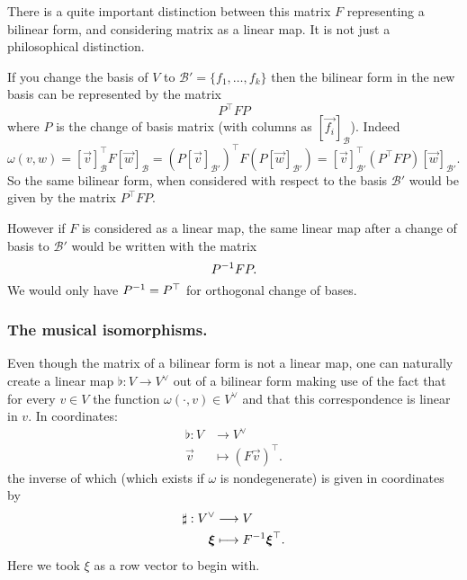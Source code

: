 \documentclass[12pt]{amsart}
\begin{document}
\begin{remark}
There is a quite important distinction between this matrix $F$ representing a bilinear form, and considering matrix as a linear map. It is not just a philosophical distinction.

If you change the basis of $V$ to $\mathcal{B}' = \{f_1, \ldots, f_k\}$ then the bilinear form in the new basis can be represented by the matrix $$P^\top F P$$ where $P$ is the change of basis matrix (with columns as $[\vec{f_i}]_\mathcal{B}$). Indeed $\omega(v,w) = [\vec{v}]_{\mathcal{B}}^\top F [\vec{w}]_{\mathcal{B} } = (P[\vec{v}]_{\mathcal{B}'})^\top F (P[\vec{w}]_{\mathcal{B}'}) = [\vec{v}]_{\mathcal{B}'}^\top (P^\top F P) [\vec{w}]_{\mathcal{B}' } $. So the same bilinear form, when considered with respect to the basis $\mathcal{B}'$ would be given by the matrix $P^\top FP$.

 However if $F$ is considered as a linear map, the same linear map after a change of basis to $\mathcal{B}'$ would be written with the matrix $$P^{-1} F P.$$ We would only have $P^{-1} = P^\top$ for orthogonal change of bases. 
\end{remark}

\subsubsection*{The musical isomorphisms. }Even though the matrix of a bilinear form is not a linear map, one can naturally create a linear map $\flat : V \to V^\vee$ out of a bilinear form making use of the fact that for every $v \in V$ the function $\omega(\cdot, v) \in V^\vee$ and that this correspondence is linear in $v$. In coordinates:
\begin{align*}
	\flat : V & \longrightarrow V^\vee\\
	 \vec{v}& \longmapsto (F\vec{v})^\top.
\end{align*}
the inverse of which (which exists if $\omega$ is nondegenerate) is given in coordinates by
\begin{align*}
	\sharp : V^\vee &\longrightarrow V\\
	\mathbf{\boldsymbol{\xi}} &\longmapsto F^{-1} \mathbf{\boldsymbol{\xi}}^\top. 
\end{align*}
Here we took $\xi$ as a row vector to begin with.
\end{document}
